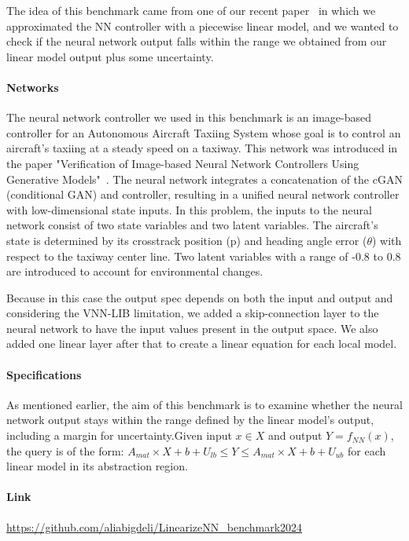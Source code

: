 \documentclass[oneside,11pt,dvipsnames]{book}
\begin{document}
The idea of this benchmark came from one of our recent paper~\cite{ArjomandBigdeli2024} in which we approximated the NN controller with a piecewise linear model, and we wanted to check if the neural network output falls within the range we obtained from our linear model output plus some uncertainty.
\paragraph*{Networks} The neural network controller we used in this benchmark is an image-based controller for an Autonomous Aircraft Taxiing System whose goal is to control an aircraft's taxiing at a steady speed on a taxiway. This network was introduced  in the paper "Verification of Image-based Neural Network Controllers Using Generative Models"~\cite{katz2021veri}. The neural network integrates a concatenation of the cGAN (conditional GAN) and controller, resulting in a unified neural network controller with low-dimensional state inputs. In this problem, the inputs to the neural network consist of two state variables and two latent variables. The aircraft's state is determined by its crosstrack position (p) and heading angle error ($\theta$) with respect to the taxiway center line. Two latent variables with a range of -0.8 to 0.8 are introduced to account for environmental changes.

Because in this case the output spec depends on both the input and output and considering the VNN-LIB limitation, we added a skip-connection layer to the neural network to have the input values present in the output space. We also added one linear layer after that to create a linear equation for each local model.
\paragraph*{Specifications} As mentioned earlier, the aim of this benchmark is to examine whether the neural network output stays within the range defined by the linear model's output, including a margin for uncertainty.Given input $x \in X$ and output $Y = f_{NN}(x)$, the query is of the form: $A_{mat}\times X + b + U_{lb} \leq Y \leq A_{mat}\times X + b + U_{ub}$ for each linear model in its abstraction region.
\paragraph*{Link} \url{https://github.com/aliabigdeli/LinearizeNN_benchmark2024}

\pagebreak
\end{document}
